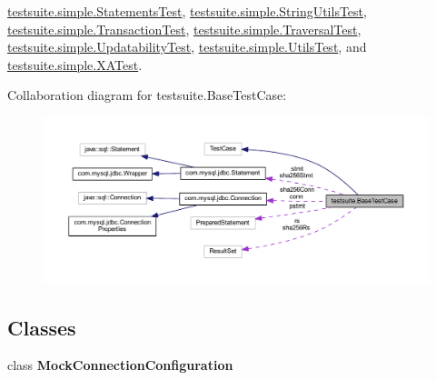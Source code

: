 \mbox{\hyperlink{classtestsuite_1_1simple_1_1_statements_test}{testsuite.\+simple.\+Statements\+Test}}, \mbox{\hyperlink{classtestsuite_1_1simple_1_1_string_utils_test}{testsuite.\+simple.\+String\+Utils\+Test}}, \mbox{\hyperlink{classtestsuite_1_1simple_1_1_transaction_test}{testsuite.\+simple.\+Transaction\+Test}}, \mbox{\hyperlink{classtestsuite_1_1simple_1_1_traversal_test}{testsuite.\+simple.\+Traversal\+Test}}, \mbox{\hyperlink{classtestsuite_1_1simple_1_1_updatability_test}{testsuite.\+simple.\+Updatability\+Test}}, \mbox{\hyperlink{classtestsuite_1_1simple_1_1_utils_test}{testsuite.\+simple.\+Utils\+Test}}, and \mbox{\hyperlink{classtestsuite_1_1simple_1_1_x_a_test}{testsuite.\+simple.\+X\+A\+Test}}.



Collaboration diagram for testsuite.\+Base\+Test\+Case\+:
\nopagebreak
\begin{figure}[H]
\begin{center}
\leavevmode
\includegraphics[width=350pt]{classtestsuite_1_1_base_test_case__coll__graph}
\end{center}
\end{figure}
\subsection*{Classes}
\begin{DoxyCompactItemize}
\item 
class {\bfseries Mock\+Connection\+Configuration}
\end{DoxyCompactItemize}
